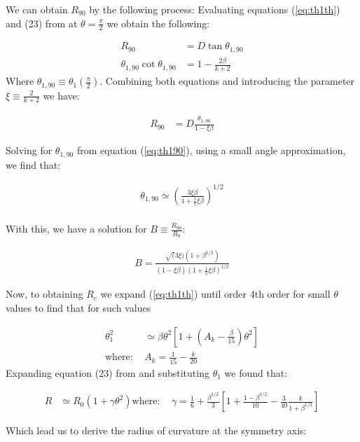 We can obtain $R_{90}$ by the following process:
Evaluating equations  (\ref{eq:th1th}) and (23) from \CRW{} at $\theta=\frac{\pi}{2}$ we obtain the following:

\begin{align}
R_{90} &= D\tan\theta_{1,90} \\
\theta_{1,90}\cot\theta_{1,90} &= 1-\frac{2\beta}{k+2} \label{eq:th190}
\end{align}
Where $\theta_{1,90}\equiv \theta_1(\frac{\pi}{2})$. Combining both equations and  introducing the parameter 
$\xi\equiv \frac{2}{k+2}$ we have:

\begin{align}
R_{90} &= D\frac{\theta_{1,90}}{1-\xi\beta} 
\end{align}


Solving for $\theta_{1,90}$ from equation (\ref{eq:th190}), using a small angle  approximation, we find that:

\begin{align}
\theta_{1,90} \simeq \left(\frac{3\xi\beta}{1+\frac{1}{5}\xi\beta}\right)^{1/2} \\
\label{eq:th190sol}
\end{align}

With this, we have a solution for $B \equiv \frac{R_{90}}{R_0}$:

\begin{align}
B = \frac{\sqrt(3\xi)\left(1+\beta^{1/2}\right)}{(1-\xi\beta)\left(1+\frac{1}{5}\xi\beta\right)^{1/2}}
\label{eq:B}
\end{align}

Now, to obtaining $R_c$ we expand  (\ref{eq:th1th}) until order 4th order for small $\theta$ values to find that for such values

\begin{align}
\theta_1^2 &\simeq \beta\theta^2\left[1+ \left(A_k-\frac{\beta}{15}\right)\theta^2\right] \\
\mathrm{where:~} & A_k = \frac{1}{15}-\frac{k}{20}
\end{align}
Expanding equation (23) from \citep{Canto:1996} and substituting $\theta_1$ we found that:

\begin{align}
R &\simeq R_0 \left(1+\gamma\theta^2\right)
\label{eq:R_approx}
\mathrm{where:~} & \gamma = \frac{1}{6} + \frac{\beta^{1/2}}{3}\left[1+\frac{1-\beta^{1/2}}{10}-\frac{3}{40}\frac{k}{1+\beta^{1/2}}\right]
\end{align}

Which lead us to derive the radius of curvature at the symmetry axis:


